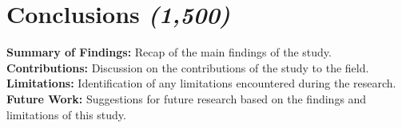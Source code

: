 \section{Conclusions \textit{(1,500)}}\label{section:conclusions}
\textbf{Summary of Findings:} Recap of the main findings of the study.\newline
\textbf{Contributions:} Discussion on the contributions of the study to the field.\newline
\textbf{Limitations:} Identification of any limitations encountered during the research.\newline
\textbf{Future Work:} Suggestions for future research based on the findings and limitations of this study.\newline